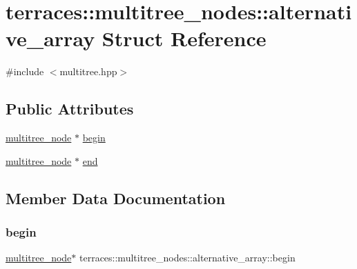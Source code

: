 \hypertarget{structterraces_1_1multitree__nodes_1_1alternative__array}{}\section{terraces\+:\+:multitree\+\_\+nodes\+:\+:alternative\+\_\+array Struct Reference}
\label{structterraces_1_1multitree__nodes_1_1alternative__array}


{\ttfamily \#include $<$multitree.\+hpp$>$}

\subsection*{Public Attributes}
\begin{DoxyCompactItemize}
\item 
\hyperlink{structterraces_1_1multitree__node}{multitree\+\_\+node} $\ast$ \hyperlink{structterraces_1_1multitree__nodes_1_1alternative__array_ab357282111bf8c0380e64f289e71ffba}{begin}
\item 
\hyperlink{structterraces_1_1multitree__node}{multitree\+\_\+node} $\ast$ \hyperlink{structterraces_1_1multitree__nodes_1_1alternative__array_a01135baa4e6bc0a2b29b312d85f24c45}{end}
\end{DoxyCompactItemize}


\subsection{Member Data Documentation}
\mbox{\label{structterraces_1_1multitree__nodes_1_1alternative__array_ab357282111bf8c0380e64f289e71ffba}} 
\subsubsection{\texorpdfstring{begin}{begin}}
{\footnotesize\ttfamily \hyperlink{structterraces_1_1multitree__node}{multitree\+\_\+node}$\ast$ terraces\+::multitree\+\_\+nodes\+::alternative\+\_\+array\+::begin}

\mbox{\label{structterraces_1_1multitree__nodes_1_1alternative__array_a01135baa4e6bc0a2b29b312d85f24c45}} 
